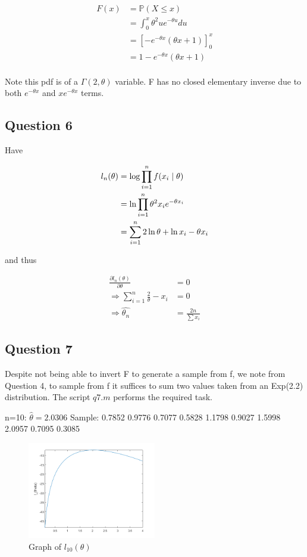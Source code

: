 \documentclass[10pt,a4paper]{report}
\begin{document}
\begin{align*}
F(x) &= \mathbb{P}(X \leq x)\\
	&= \int_0^x \theta^2ue^{-\theta u}du \\
	&= \left[-e^{-\theta x}(\theta x +1)\right]_0^x\\
	&= 1-e^{-\theta x}(\theta x +1)\\
\end{align*}

Note this pdf is of a $\Gamma(2,\theta)$ variable. F has no closed elementary inverse due to both $e^{-\theta x}$ and $xe^{-\theta x}$ terms.

\subsection*{Question 6}

Have 

\begin{align*}
l_n(\theta)&= \log\prod_{i=1}^n f(x_i \hspace{1mm}| \hspace{1mm} \theta)\\
&=\ln\prod_{i=1}^n \theta^2x_i e^{-\theta x_i}\\
&=\sum_{i=1}^n 2\ln \theta +\ln x_i -\theta x_i
\end{align*}

and thus 

\begin{align*}
\frac{\partial l_n(\theta)}{\partial \theta} &= 0\\
\Rightarrow \sum_{i=1}^n \frac{2}{\theta} - x_i &=0\\
\Rightarrow \hat{\theta_n} &= \frac{2n}{\sum x_i}
\end{align*}

\newpage

\subsection*{Question 7}
Despite not being able to invert F to generate a sample from f, we note from Question 4, to sample from f it suffices to sum two values taken from an Exp(2.2) distribution. The script $q7.m$ performs the required task.

\vspace{5mm}

n=10: $\hat{\theta}=2.0306$  Sample: 
0.7852	0.9776	0.7077	0.5828	1.1798	0.9027	1.5998	2.0957	0.7095	0.3085

\begin{figure}[ht]
\centering
\includegraphics[width=0.5\textwidth]{q7n10.png}
\caption{Graph of $l_{10}(\theta)$ }
\end{figure}
\end{document}
